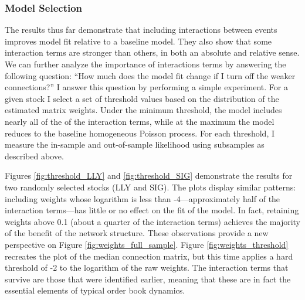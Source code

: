		\subsubsection{Model Selection}
			The results thus far demonstrate that including interactions between events improves model fit relative to a baseline model. They also show that some interaction terms are stronger than others, in both an absolute and relative sense. We can further analyze the importance of interactions terms by answering the following question: ``How much does the model fit change if I turn off the weaker connections?'' I answer this question by performing a simple experiment. For a given stock I select a set of threshold values based on the distribution of the estimated matrix weights. Under the minimum threshold, the model includes nearly all of the of the interaction terms, while at the maximum the model reduces to the baseline homogeneous Poisson process. For each threshold, I measure the in-sample and out-of-sample likelihood using subsamples as described above.

			Figures \ref{fig:threshold_LLY} and \ref{fig:threshold_SIG} demonstrate the results for two randomly selected stocks (LLY and SIG). The plots display similar patterns: including weights whose logarithm is less than -4---approximately half of the interaction terms---has little or no effect on the fit of the model. In fact, retaining weights above 0.1 (about a quarter of the interaction terms) achieves the majority of the benefit of the network structure. These observations provide a new perspective on Figure \ref{fig:weights_full_sample}. Figure \ref{fig:weights_threshold} recreates the plot of the median connection matrix, but this time applies a hard threshold of -2 to the logarithm of the raw weights. The interaction terms that survive are those that were identified earlier, meaning that these are in fact the essential elements of typical order book dynamics.

